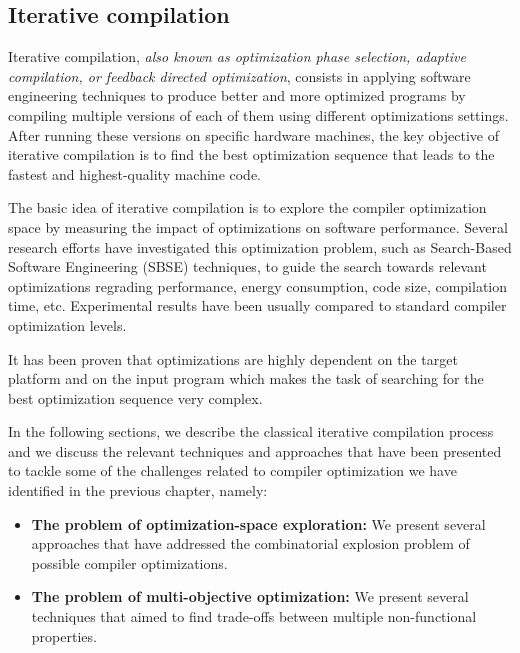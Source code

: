 \subsection{Iterative compilation}
Iterative compilation, \textit{also known as optimization phase selection, adaptive compilation, or feedback directed optimization}\cite{triantafyllis2003compiler}, consists in applying software engineering techniques to produce better and more optimized programs by compiling multiple versions of each of them using different optimizations settings. After running these versions on specific hardware machines, the key objective of iterative compilation is to find the best optimization sequence that leads to the fastest and highest-quality machine code. 

The basic idea of iterative compilation is to explore the compiler optimization space by measuring the impact of optimizations on software performance.
Several research efforts have investigated this optimization problem, such as Search-Based Software Engineering (SBSE) techniques, to guide the search towards relevant optimizations regrading performance, energy consumption, code size, compilation time, etc. Experimental results have been usually compared to standard compiler optimization levels.  

It has been proven that optimizations are highly dependent on the target platform and on the input program which makes the task of searching for the best optimization sequence very complex\cite{triantafyllis2003compiler}.

In the following sections, we describe the classical iterative compilation process and we discuss the relevant techniques and approaches that have been presented to tackle some of the challenges related to compiler optimization we have identified in the previous chapter, namely:
\begin{itemize}
	\item \textbf{The problem of optimization-space exploration:} We present several approaches that have addressed the combinatorial explosion problem of possible compiler optimizations.
	
	\item \textbf{The problem of multi-objective optimization:} We present several techniques that aimed to find trade-offs between multiple non-functional properties.
		
\end{itemize}

